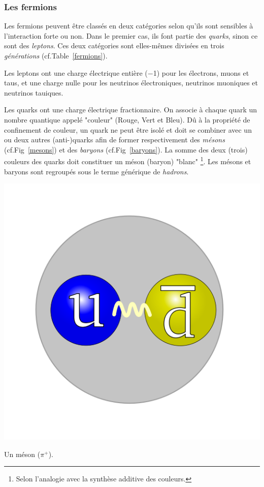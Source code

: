 \subsubsection{Les fermions}
Les fermions peuvent être classés en deux catégories selon qu'ils sont sensibles à l'interaction forte ou non. Dans le premier cas, ils font partie des \textit{quarks}, sinon ce sont des \textit{leptons}. Ces deux catégories sont elles-mêmes divisées en trois \textit{générations} (cf.Table~\ref{fermions}).

Les leptons ont une charge électrique entière (\num{-1}) pour les électrons, muons et taus, et une charge nulle pour les neutrinos électroniques, neutrinos muoniques et neutrinos tauiques.

Les quarks ont une charge électrique fractionnaire. On associe à chaque quark un nombre quantique appelé "couleur" (Rouge, Vert et Bleu). Dû à la propriété de confinement de couleur, un quark ne peut être isolé et doit se combiner avec un ou deux autres (anti-)quarks afin de former respectivement des \textit{mésons} (cf.Fig~\ref{mesons}) et des \textit{baryons} (cf.Fig~\ref{baryons}). La somme des deux (trois) couleurs des quarks doit constituer un méson (baryon) "blanc" \footnote{Selon l'analogie avec la synthèse additive des couleurs.}. Les mésons et baryons sont regroupés sous le terme générique de \textit{hadrons}.

\marginpar
{
	\centering
	\includegraphics[width=\marginparwidth]{SM/quarks2.png}
	\captionsetup{type=figure}\caption{Un méson ($\pi^{+}$).}
	\label{mesons}
}

